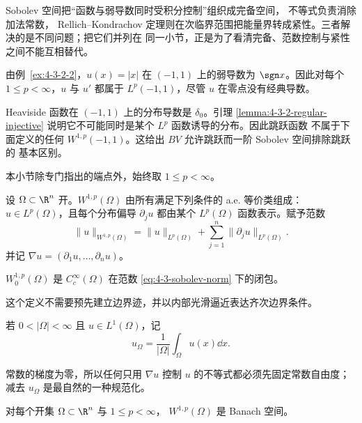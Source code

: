 Sobolev 空间把“函数与弱导数同时受积分控制”组织成完备空间，\Poincare{} 不等式负责消除加法常数，
Rellich--Kondrachov 定理则在次临界范围把能量界转成紧性。三者解决的是不同问题；把它们并列在
同一小节，正是为了看清完备、范数控制与紧性之间不能互相替代。

\begin{example}[绝对值函数]\label{ex:4-3-3-1}
由例~\ref{ex:4-3-2-2}，$u(x)=|x|$ 在 $(-1,1)$ 上的弱导数为 $\sgn x$。因此对每个
$1\leq p<\infty$，$u$ 与 $u'$ 都属于 $L^p(-1,1)$，尽管 $u$ 在零点没有经典导数。
\end{example}

\begin{example}[跳跃不在 $W^{1,p}$]\label{ex:4-3-3-2}
Heaviside 函数在 $(-1,1)$ 上的分布导数是 $\delta_0$。引理
\ref{lemma:4-3-2-regular-injective} 说明它不可能同时是某个 $L^p$ 函数诱导的分布。因此跳跃函数
不属于下面定义的任何 $W^{1,p}(-1,1)$。这给出 $BV$ 允许跳跃而一阶 Sobolev 空间排除跳跃的
基本区别。
\end{example}

本小节除专门指出的端点外，始终取 $1\leq p<\infty$。

\begin{definition}[Sobolev 空间]\label{def:4-3-3-1}
设 $\Omega\subset\R^n$ 开。$W^{1,p}(\Omega)$ 由所有满足下列条件的 a.e. 等价类组成：
$u\in L^p(\Omega)$，且每个分布偏导 $\partial_ju$ 都由某个 $L^p(\Omega)$ 函数表示。赋予范数
\[
 \|u\|_{W^{1,p}(\Omega)}
 =\|u\|_{L^p(\Omega)}+
  \sum_{j=1}^n\|\partial_ju\|_{L^p(\Omega)}.
 \tag{4.3.8}\label{eq:4-3-sobolev-norm}
\]
并记 $\nabla u=(\partial_1u,\ldots,\partial_n u)$。
\end{definition}

\begin{definition}[$W_0^{1,p}$]\label{def:4-3-3-2}
$W_0^{1,p}(\Omega)$ 是 $C_c^\infty(\Omega)$ 在范数
\eqref{eq:4-3-sobolev-norm} 下的闭包。
\end{definition}

这个定义不需要预先建立边界迹，并以内部光滑逼近表达齐次边界条件。

\begin{definition}[平均零规范化]\label{def:4-3-3-3}
若 $0<|\Omega|<\infty$ 且 $u\in L^1(\Omega)$，记
\[
 u_\Omega=\frac1{|\Omega|}\int_\Omega u(x)\dd x.
\]
\end{definition}

常数的梯度为零，所以任何只用 $\nabla u$ 控制 $u$ 的不等式都必须先固定常数自由度；减去
$u_\Omega$ 是最自然的一种规范化。

\begin{theorem}[$W^{1,p}$ 完备]\label{theorem:4-3-3-1}
对每个开集 $\Omega\subset\R^n$ 与 $1\leq p<\infty$，
$W^{1,p}(\Omega)$ 是 Banach 空间。
\end{theorem}

